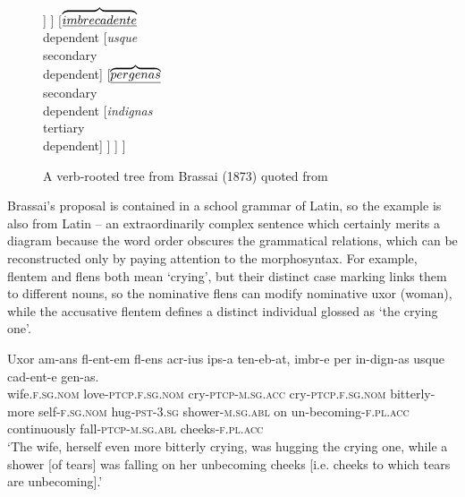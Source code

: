\documentclass[output=paper]{langscibook}
\begin{document}
\begin{figure}
	\centering
\begin{forest}
[\emph{tenebat}\\governing verb
	[\emph{flentem}\\dependent]
	[\emph{Uxor}\\dependent
		[\emph{amans}\\attribute]
		[\emph{ipsa}\\attribute]
		[\emph{flens}\\attribute
			[\emph{acrius}\\tertiary\\dependent]
		]
	]
	[$\overbrace{\emph{imbre cadente}}$\\dependent
		[\emph{usque}\\secondary\\dependent]
		[$\overbrace{\emph{per genas}}$\\secondary\\dependent
			[\emph{indignas}\\tertiary\\dependent]
		]
	]
]
\end{forest}
\caption{A verb-rooted tree from Brassai (1873) quoted from }\label{fig:3}
\end{figure}
 
Brassai’s proposal is contained in a school grammar of Latin, so the example is also from Latin – an
extraordinarily complex sentence which certainly merits a diagram because the word order obscures the grammatical relations, which can be reconstructed only by paying attention to the morphosyntax. For example, flentem and flens both mean ‘crying’, but their distinct case marking links them to different nouns, so the nominative flens can modify nominative uxor (woman), while the accusative flentem defines a distinct individual glossed as ‘the crying one’.

\ea
\label{ex:1}
\gll Uxor am-ans fl-ent-em fl-ens acr-ius ips-a ten-eb-at, imbr-e per in-dign-as usque cad-ent-e gen-as.\\
     wife\textsc{.f.sg.nom} love\textsc{-ptcp.f.sg.nom} cry\textsc{-ptcp-m.sg.acc} cry\textsc{-ptcp.f.sg.nom} bitterly-more self\textsc{-f.sg.nom} hug\textsc{-pst-3.sg} shower\textsc{-m.sg.abl} on un-becoming\textsc{-f.pl.acc} continuously fall\textsc{-ptcp-m.sg.abl} cheeks\textsc{-f.pl.acc}\\
	\glt ‘The wife, herself even more bitterly crying, was hugging the crying one, while a shower [of tears] was falling on her unbecoming cheeks [i.e. cheeks to which tears are unbecoming].’
\z
\end{document}
